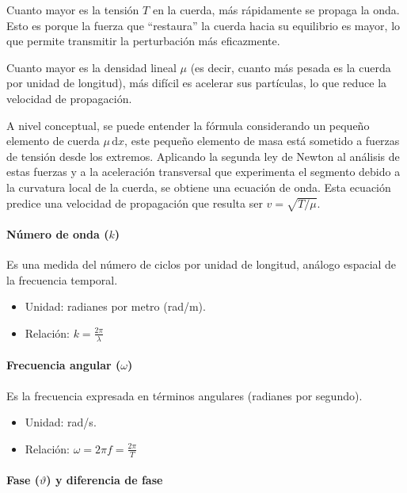 Cuanto mayor es la tensión \(T\) en la cuerda, más rápidamente se propaga la onda. Esto es porque la fuerza que ``restaura'' la cuerda hacia su equilibrio es mayor, lo que permite transmitir la perturbación más eficazmente.

Cuanto mayor es la densidad lineal \(\mu\) (es decir, cuanto más pesada es la cuerda por unidad de longitud), más difícil es acelerar sus partículas, lo que reduce la velocidad de propagación.

A nivel conceptual, se puede entender la fórmula considerando un pequeño elemento de cuerda \(\mu \, \mathrm{d}x\), este pequeño elemento de masa está sometido a fuerzas de tensión desde los extremos. Aplicando la segunda ley de Newton al análisis de estas fuerzas y a la aceleración transversal que experimenta el segmento debido a la curvatura local de la cuerda, se obtiene una ecuación de onda. Esta ecuación predice una velocidad de propagación que resulta ser \(v = \sqrt{T / \mu}\).

\paragraph{Número de onda (\(k\))}

Es una medida del número de ciclos por unidad de longitud, análogo espacial de la frecuencia temporal.

\begin{itemize}
  \item Unidad: radianes por metro (rad/m).
  \item Relación: \(k = \frac{2\pi}{\lambda}\)
\end{itemize}

\paragraph{Frecuencia angular (\(\omega\))}

Es la frecuencia expresada en términos angulares (radianes por segundo).

\begin{itemize}
  \item Unidad: rad/s.
  \item Relación: \(\omega = 2\pi f = \frac{2\pi}{T}\)
\end{itemize}

\paragraph{Fase (\(\vartheta\)) y diferencia de fase}

